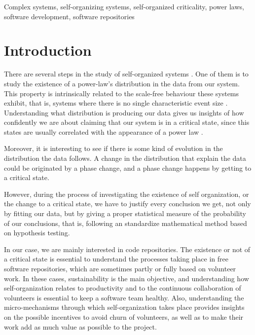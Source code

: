 \documentclass[conference]{IEEEtran}
\begin{document}
\begin{IEEEkeywords}
	Complex systems, self-organizing systems, self-organized criticality, power laws, software development, 
	software repositories
\end{IEEEkeywords}


\section{Introduction}\label{introduction}

There are several steps in the study of self-organized systems  \cite{bak1988self}. One of
them is to study the existence of a power-law's distribution in the data
from our system. This property is intrinsically related to the scale-free behaviour
these systems exhibit, that is, systems where there is no single characteristic event size \cite{golyk20self}.
Understanding what distribution is producing our data gives us insights of
how confidently we are about claiming that our system is in a critical state, since this states
are usually correlated with the appearance of a power law \cite{newman2005power}. %

Moreover, it is interesting to see if there is some kind of evolution in the distribution the data follows. 
A change in the distribution that explain the data could be originated by a 
phase change, and a phase change happens by getting to a critical state. %

However, during the process of investigating the existence of self organization, or the change to a critical state, we have to justify every conclusion we get, not only 
by fitting our data, but by giving a proper statistical measure of the probability 
of our conclusions, that is, following an standardize mathematical method based on
hypothesis testing.

In our case, we are mainly interested in code repositories. The
existence or not of a critical state is essential to understand the
processes taking place in free software repositories, which are
sometimes partly or fully based on volunteer work. In these cases,
sustainability is the main objective, and understanding how
self-organization relates to productivity and to the continuous
collaboration of volunteers is essential to keep a software team
healthy. Also, understanding the micro-mechanisms through which
self-organization takes place provides insights on the possible
incentives to avoid churn of volunteers, as well as to make their work
add as much value as possible to the project.
\end{document}
